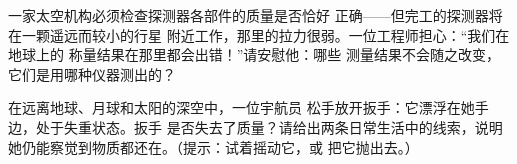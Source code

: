 \begin{exercise}[$\star\star$]\label{exo:g4:weight-and-mass:10}
一家太空机构必须检查探测器各部件的质量是否恰好
正确——但完工的探测器将在一颗遥远而较小的行星
附近工作，那里的拉力很弱。一位工程师担心：“我们在地球上的
称量结果在那里都会出错！”请安慰他：哪些
测量结果不会随之改变，它们是用哪种仪器测出的？
\end{exercise}

\begin{exercise}[$\star\star$]\label{exo:g4:weight-and-mass:11}
在远离地球、月球和太阳的深空中，一位宇航员
松手放开扳手：它漂浮在她手边，处于失重状态。扳手
是否失去了质量？请给出两条日常生活中的线索，说明
她仍能察觉到物质都还在。（提示：试着摇动它，或
把它抛出去。）
\end{exercise}
